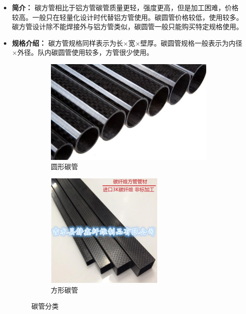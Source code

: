 \documentclass[UTF8]{article} %
\begin{document}
\begin{itemize}
  \item \textbf{简介：} 碳方管相比于铝方管碳管质量更轻，强度更高，但是加工困难，价格较高。一般只在轻量化设计时代替铝方管使用。碳圆管价格较低，使用较多。
  碳方管设计除不能焊接外与铝方管类似，碳圆管一般只能购买特定规格使用。

  \item \textbf{规格介绍：} 碳方管规格同样表示为长$\times$宽$\times$壁厚。碳圆管规格一般表示为内径$\times$外径。队内碳圆管使用较多，方管很少使用。

  \begin{figure}[H]
    \centering
    \begin{subfigure}[b]{0.39\textwidth}
           \centering
           \includegraphics[width=\textwidth]{tan1.png}
            \caption{圆形碳管}
    \end{subfigure}
    \quad
    \begin{subfigure}[b]{0.3\textwidth}
            \centering
            \includegraphics[width=\textwidth]{tan2.png}
            \caption{方形碳管}
    \end{subfigure}
    \caption{碳管分类}
  \end{figure}


\end{itemize}
\end{document}
